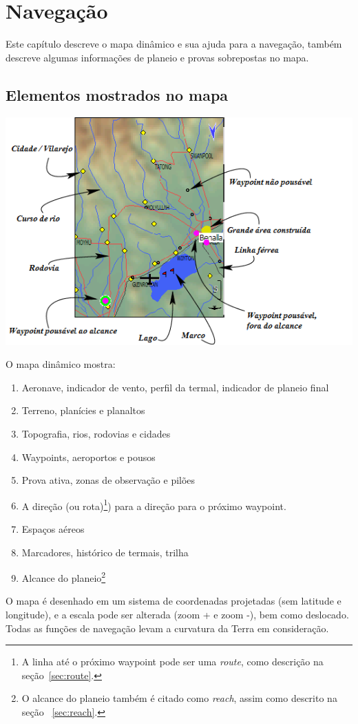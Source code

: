 \chapter{Navegação}\label{cha:navigation}
Este capítulo descreve o mapa dinâmico e sua ajuda para a navegação, também descreve algumas informações de planeio e provas sobrepostas no mapa.

\section{Elementos mostrados no mapa}

\begin{maxipage}
\includegraphics[angle=0,width=0.9\linewidth,keepaspectratio='true']{figures/fig-map.png}
\end{maxipage}

O mapa dinâmico mostra: 
\begin{enumerate} 
\item Aeronave, indicador de vento, perfil da termal, indicador de planeio final
\item Terreno, planícies e planaltos
\item Topografia, rios, rodovias e cidades
\item Waypoints, aeroportos e pousos
\item Prova ativa, zonas de observação e pilões
\item A direção (ou rota)\footnote {A linha até o próximo waypoint pode ser uma {\em route}, como descrição na seção~\ref{sec:route}.}) para a direção para o próximo waypoint.
\item Espaços aéreos
\item Marcadores, histórico de termais, trilha
\item Alcance do planeio\footnote{O alcance do planeio também é citado como
  {\em reach}, assim como descrito na seção ~\ref{sec:reach}.}
\end{enumerate}
O mapa é desenhado em um sistema de coordenadas projetadas (sem latitude e longitude), e a escala pode ser alterada (zoom + e zoom -), bem como deslocado.  Todas as funções de navegação levam a curvatura da Terra em consideração.

